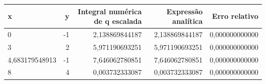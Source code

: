 \begin{tabular}{lrrrr}
\toprule
x & y & Integral numérica de q escalada & Expressão analítica & Erro relativo \\
\midrule
0 & -1 & 2,138869844187 & 2,138869844187 & 0,000000000000 \\
3 & 2 & 5,971190693251 & 5,971190693251 & 0,000000000000 \\
4,683179548913 & -1 & 7,646062780851 & 7,646062780851 & 0,000000000000 \\
8 & 4 & 0,003732333087 & 0,003732333087 & 0,000000000000 \\
\bottomrule
\end{tabular}
